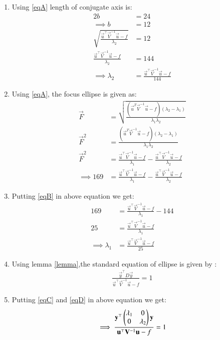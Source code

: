 \documentclass[journal,12pt,twocolumn]{IEEEtran}
\begin{document}
\begin{enumerate}
\item Using \eqref{eqA} length of conjugate axis is:
\begin{align}
2b &= 24
\\
\implies b  &= 12
\\
 \sqrt{\frac{\vec{u}^{\top}\vec{V}^{-1}\vec{u}-f}{\lambda_2}} &= 12
\\
 \frac{\vec{u}^{\top}\vec{V}^{-1}\vec{u}-f}{\lambda_2} &= 144 \label{eqB}
\\
\implies \lambda_2&=\frac{\vec{u}^{\top}\vec{V}^{-1}\vec{u}-f}{144}\label{eqC} 
\end{align}
 \item Using \eqref{eqA}, the focus ellipse is given as:
\begin{align}
 \vec{F} &= \sqrt{\frac{(\vec{u}^T\vec{V}^{-1}\vec{u}-f)(\lambda_2-\lambda_1)}{\lambda_1\lambda_2}}
 \\
 \vec{F}^2 &= \frac{(\vec{u}^T\vec{V}^{-1}\vec{u}-f)(\lambda_2-\lambda_1)}{\lambda_1\lambda_2}
 \\
 \vec{F}^2 &= \frac{\vec{u}^{\top}\vec{V}^{-1}\vec{u}-f}{\lambda_1}-\frac{\vec{u}^{\top}\vec{V}^{-1}\vec{u}-f}{\lambda_2}
 \\
\implies 169 &= \frac{\vec{u}^{\top}\vec{V}^{-1}\vec{u}-f}{\lambda_1}-\frac{\vec{u}^{\top}\vec{V}^{-1}\vec{u}-f}{\lambda_2}
\end{align}
\item Putting \eqref{eqB} in above equation we get:
\begin{align}
    169 &= \frac{\vec{u}^{\top}\vec{V}^{-1}\vec{u}-f}{\lambda_1}-144
    \\
    25 &= \frac{\vec{u}^{\top}\vec{V}^{-1}\vec{u}-f}{\lambda_1}
    \\
     \implies\lambda_1&=\frac{\vec{u}^{\top}\vec{V}^{-1}\vec{u}-f}{25} \label{eqD}
\end{align}
\item Using lemma \eqref{lemma},the standard equation of ellipse is given by :
\begin{align}
\frac{\vec{y}^{\top}D\vec{y}}{\vec{u}^{\top}\vec{V}^{-1}\vec{u}-f}=1
\end{align}
\item Putting \eqref{eqC} and \eqref{eqD} in above equation we get:
\begin{align}
\implies \frac{\mathbf{y}^{\top}\begin{pmatrix}\lambda_1& 0 \\ 0 & \lambda_2\end{pmatrix}\mathbf{y} }{\mathbf{u}^{\top}\mathbf{V}^{-1}\mathbf{u}-f}=1
\end{align}

\end{enumerate}
\end{document}
